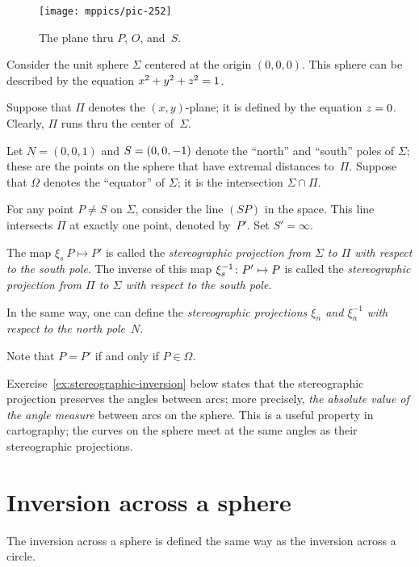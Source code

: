 {

\begin{wrapfigure}{r}{48mm}
\vskip-6mm
\centering
\texttt{[image: mppics/pic-252]}
\caption*{The plane thru $P$, $O$, and~$S$.}
\end{wrapfigure}

Consider the unit sphere $\Sigma$ 
centered at the origin $(0,0,0)$.
This sphere can be described by the equation $x^2+y^2+z^2=1$. 

Suppose that $\Pi$ denotes the $(x,y)$-plane;
it is defined by the equation $z = 0$.
Clearly, $\Pi$
runs thru the center of~$\Sigma$.

Let $N = (0, 0, 1)$ and $S=(0, 0, -1)$ denote the ``north'' and ``south'' poles of $\Sigma$;
these are the points on the sphere that have extremal distances to~$\Pi$.
Suppose that $\Omega$ denotes the ``equator'' of $\Sigma$;
it is the intersection $\Sigma\cap\Pi$.

}

For any point $P\ne S$ on $\Sigma$,
consider the line $(SP)$ in the space. 
This line intersects $\Pi$ at exactly one point, denoted by~$P'$. 
Set $S'=\infty$.


The map $\xi_s\: P\mapsto P'$ is called the \emph{stereographic projection from $\Sigma$ to $\Pi$ with respect to the south pole}.
The inverse of this map $\xi^{-1}_s\colon P'\mapsto P$ is called the {}\emph{stereographic projection from $\Pi$ to $\Sigma$ with respect to the south pole}.

In the same way, one can define the
{}\emph{stereographic projections $\xi_n$ and $\xi^{-1}_n$ with respect to the north pole}~$N$.

Note that $P=P'$ if and only if $P\in\Omega$.

Exercise~\ref{ex:stereographic-inversion} below states that the stereographic projection preserves 
the angles between arcs;
more precisely, \textit{the absolute value of the angle measure} between arcs on the sphere.
This is a useful property in cartography;
the curves on the sphere meet at the same angles as their stereographic projections.


\section[The inversion]{Inversion across a sphere}

The inversion across a sphere is defined the same way as the inversion across a circle.


